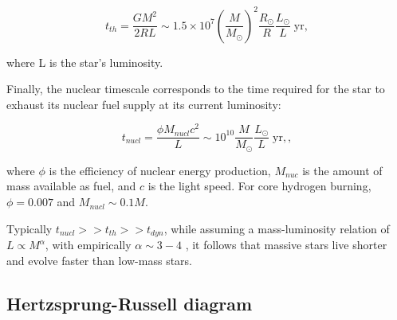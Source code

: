 \begin{equation}
    t_{th} = \frac{G M^2}{2RL} \sim 1.5 \times 10^7 \left( \frac{M}{M_{\odot}} \right)^{2} \frac{R_{\odot}}{R} \frac{L_{\odot}}{L} \; \text{yr},
\end{equation}\label{eq:thermal_timsecale}

where L is the star's luminosity.

Finally, the nuclear timescale corresponds to the time required for the star to exhaust its nuclear fuel supply at its current luminosity: 

\begin{equation}
    t_{nucl} = \frac{\phi M_{nucl} c^2}{L} \sim 10^{10} \frac{M}{M_{\odot}} \frac{L_{\odot}}{L} \; \text{yr},,
\end{equation}\label{eq:nuclear_timsecale}

where $\phi$ is the efficiency of nuclear energy production, $M_{nuc}$ is the amount of mass available as fuel, and $c$ is the light speed. For core hydrogen burning, $\phi = 0.007$ and $M_{nucl} \sim 0.1 M$.

Typically $t_{nucl} >> t_{th} >> t_{dyn}$, while assuming a mass-luminosity relation of $L \propto M^{\alpha}$, with empirically $\alpha \sim 3-4$ \citep{eker2015main}, it follows that massive stars live shorter and evolve faster than low-mass stars.

\subsection{Hertzsprung-Russell diagram}

